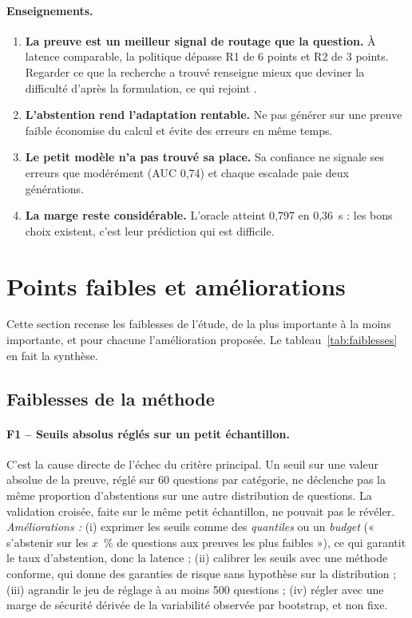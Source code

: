 \documentclass[11pt,a4paper]{article}
\begin{document}
\paragraph{Enseignements.}
\begin{enumerate}
\item \textbf{La preuve est un meilleur signal de routage que la question.} À latence comparable, la
politique dépasse R1 de 6 points et R2 de 3 points. Regarder ce que la recherche a trouvé renseigne
mieux que deviner la difficulté d'après la formulation, ce qui rejoint \citet{li2026beyond}.
\item \textbf{L'abstention rend l'adaptation rentable.} Ne pas générer sur une preuve faible économise du
calcul et évite des erreurs en même temps.
\item \textbf{Le petit modèle n'a pas trouvé sa place.} Sa confiance ne signale ses erreurs que
modérément (AUC 0,74) et chaque escalade paie deux générations.
\item \textbf{La marge reste considérable.} L'oracle atteint 0,797 en 0,36~s : les bons choix existent,
c'est leur prédiction qui est difficile.
\end{enumerate}

\section{Points faibles et améliorations}\label{sec:faiblesses}

Cette section recense les faiblesses de l'étude, de la plus importante à la moins importante, et pour
chacune l'amélioration proposée. Le tableau~\ref{tab:faiblesses} en fait la synthèse.

\subsection{Faiblesses de la méthode}

\paragraph{F1 -- Seuils absolus réglés sur un petit échantillon.} C'est la cause directe de l'échec du
critère principal. Un seuil sur une valeur absolue de la preuve, réglé sur 60 questions par catégorie,
ne déclenche pas la même proportion d'abstentions sur une autre distribution de questions. La
validation croisée, faite sur le même petit échantillon, ne pouvait pas le révéler.
\emph{Améliorations :} (i) exprimer les seuils comme des \emph{quantiles} ou un \emph{budget} (« s'abstenir
sur les $x$~\% de questions aux preuves les plus faibles »), ce qui garantit le taux d'abstention, donc
la latence ; (ii) calibrer les seuils avec une méthode conforme, qui donne des garanties de risque sans
hypothèse sur la distribution \citep{hao2026racer} ; (iii) agrandir le jeu de réglage à au moins
500 questions ; (iv) régler avec une marge de sécurité dérivée de la variabilité observée par bootstrap,
et non fixe.
\end{document}
